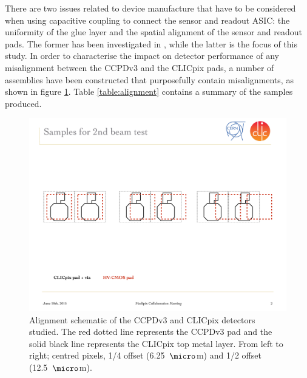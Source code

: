 There are two issues related to device manufacture that have to be considered when using capacitive coupling to connect the sensor and readout ASIC: the uniformity of the glue layer and the spatial alignment of the sensor and readout pads.  The former has been investigated in \cite{FabricationNote}, while the latter is the focus of this study.  In order to characterise the impact on detector performance of any misalignment between the CCPDv3 and the CLICpix pads, a number of assemblies have been constructed that purposefully contain misalignments, as shown in figure \ref{fig:alignment}.  Table \ref{table:alignment} contains a summary of the samples produced.

\begin{figure}[h!]
\centering
\includegraphics[width=1.0\textwidth]{CLICdpVertex/Plots/misalignedPads.pdf}
\caption[Alignment schematic of the CCPDv3 and CLICpix detectors studied.  The red dotted line represents the CCPDv3 pad and the solid black line represents the CLICpix top metal layer.  From left to right; centred pixels, 1/4 offset (6.25~${\micro}$m) and 1/2 offset (12.5~${\micro}$m).]{Alignment schematic of the CCPDv3 and CLICpix detectors studied.  The red dotted line represents the CCPDv3 pad and the solid black line represents the CLICpix top metal layer.  From left to right; centred pixels, 1/4 offset (6.25~${\micro}$m) and 1/2 offset (12.5~${\micro}$m).}
\label{fig:alignment}
\end{figure}

